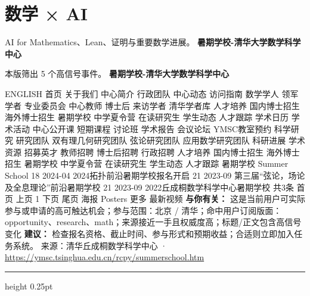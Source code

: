 \documentclass[10.5pt]{ctexart}
\begin{document}
\section*{数学 × AI}
{\color{ormuted} AI for Mathematics、Lean、证明与重要数学进展。}
\vspace{2mm}
{\LARGE\bfseries 暑期学校-清华大学数学科学中心}\par
\vspace{1mm}
{\color{ormuted} 本版筛出 5 个高信号事件。}
\vspace{3mm}
{\Large\bfseries 暑期学校-清华大学数学科学中心}\par
ENGLISH 首页 关于我们 中心简介 行政团队 中心动态 访问指南 数学学人 领军学者 专业委员会 中心教师 博士后 来访学者 清华学者库 人才培养 国内博士招生 海外博士招生 暑期学校 中学夏令营 在读研究生 学生动态 人才跟踪 学术日历 学术活动 中心公开课 短期课程 讨论班 学术报告 会议论坛 YMSC教室预约 科学研究 研究团队 双有理几何研究团队 弦论研究团队 应用数学研究团队 科研进展 学术资源 招募英才 教师招聘 博士后招聘 行政招聘 人才培养 国内博士招生 海外博士招生 暑期学校 中学夏令营 在读研究生 学生动态 人才跟踪 暑期学校 Summer School 18 2024-04 2024拓扑前沿暑期学校报名开启 21 2023-09 第三届“弦论，场论及全息理论”前沿暑期学校 21 2023-09 2022丘成桐数学科学中心暑期学校 共3条 首页 上页 1 下页 尾页 海报 Posters 更多 最新视频
\textbf{与你有关：} 这是当前用户可实际参与或申请的高可触达机会；参与范围：北京 / 清华；命中用户订阅版面：opportunity、research、math；来源接近一手且权威度高；标题/正文包含高信号变化
\textbf{建议：} 检查报名资格、截止时间、参与形式和预期收益；合适则立即加入任务系统。
{\footnotesize\color{ormuted} 来源：清华丘成桐数学科学中心 · \url{https://ymsc.tsinghua.edu.cn/rcpy/summerschool.htm}}
\vspace{4mm}
\hrule height 0.25pt
\vspace{3mm}
\end{document}
